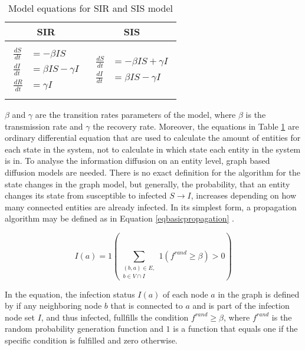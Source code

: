 \begin{table}[ht!]
    \centering
    \begin{tabular}{|c | c |} 
     \hline
     SIR & SIS  \\ 
     \hline
     & \\
     $\begin{aligned}
          \frac{dS}{dt} &= -\beta I S \\
          \frac{dI}{dt} &= \beta I S - \gamma I \\
          \frac{dR}{dt} &= \gamma I  
        \end{aligned}$
      &
      $\begin{aligned}
          \frac{dS}{dt} &= -\beta I S + \gamma I\\
          \frac{dI}{dt} &= \beta I S - \gamma I
        \end{aligned}$
       \\ 
       & \\
     \hline
    \end{tabular}
    \caption{Model equations for SIR and SIS model \cite{sirequation}}
    \label{SI-table-equations}
\end{table}

$\beta$ and $\gamma$ are the transition rates parameters of the model, where 
$\beta$ is the transmission rate and $\gamma$ the 
recovery rate. Moreover, the equations in Table \ref{SI-table-equations}
are ordinary differential equation that are used to calculate the amount
of entities for each state in the system, not to calculate in which state
each entity in the system is in. To analyse the information diffusion on 
an entity level, graph based diffusion models are needed.
There is no exact definition for the algorithm for the state changes in the
graph model, but generally, the probability, that an entity changes
its state from susceptible to infected $S \to I$, increases depending on
how many connected entities are already infected. In its simplest form, a
propagation algorithm may be defined as in Equation \ref{eqbasicpropagation} 
\cite{easypropagation}.

\begin{equation}
    I(a) = 1 (\sum\limits_{\substack{(b,a)\in E, \\ b \in V \cap I}}
    1(f^{rand}\geq \beta)>0) 
    \label{eqbasicpropagation}
\end{equation}

In the equation, the infection status $I(a)$ of each node $a$
in the graph is defined by if any neighboring node $b$ that is connected 
to $a$ and is part of the infection node set $I$, 
and thus infected, fullfills the condition $f^{rand}\geq \beta$,
where $f^{rand}$ is the random probability generation function and $1$ 
is a function that equals one if the specific condition is fulfilled and 
zero otherwise.

